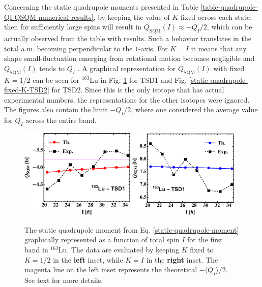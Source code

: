 Concerning the static quadrupole moments presented in Table \ref{table-quadrupole-QI-QSQM-numerical-results}, by keeping the value of $K$ fixed across each state, then for sufficiently large spins will result in $Q_\text{SQM}(I)\approx -Q_I/2$, which can be actually observed from the table with results. Such a behavior translates in the total a.m. becoming perpendicular to the $1$-axis. For $K=I$ it means that any shape small-fluctuation emerging from rotational motion becomes negligible and $Q_\text{SQM}(I)$ tends to $Q_I$ \cite{bohr1998nuclear}. A graphical representation for $Q_\text{SQM}(I)$ with fixed $K=1/2$ can be seen for $^{163}$Lu in Fig. \ref{static-quadrupole-fixed-K-TSD1} for TSD1 and Fig. \ref{static-quadrupole-fixed-K-TSD2} for TSD2. Since this is the only isotope that has actual experimental numbers, the representations for the other isotopes were ignored. The figures also contain the limit $-Q_I/2$, where one considered the average value for $Q_I$ across the entire band.
\begin{figure}
    \centering
    \includegraphics[width=0.49\textwidth]{Chapters/Figures/Q_SQM_163Lu.pdf}
    \includegraphics[width=0.47\textwidth]{Chapters/Figures/Q_SQM_163Lu-2.pdf}
    \caption{The static quadrupole moment from Eq. \ref{static-quadrupole-moment} graphically represented as a function of total spin $I$ for the first band in $^{163}$Lu. The data are evaluated by keeping $K$ fixed to $K=1/2$ in the \textbf{left} inset, while $K=I$ in the \textbf{right} inset. The magenta line on the left inset represents the theoretical $-\langle Q_I\rangle/2$. See text for more details.}
    \label{static-quadrupole-fixed-K-TSD1}
\end{figure}

